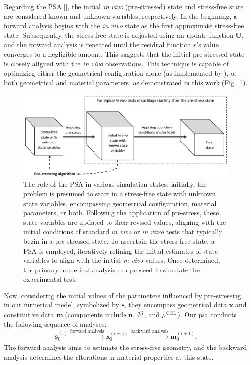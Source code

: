 Regarding the PSA [\cite{bols2013}], the initial \textit{in vivo} (pre-stressed) state and stress-free state are considered known and unknown variables, respectively. In the beginning, a forward analysis begins with the \textit{in vivo} state as the first approximate stress-free state. Subsequently, the stress-free state is adjusted using an update function $\textbf{U}$, and the forward analysis is repeated until the residual function $r$'s value converges to a negligible amount. This suggests that the initial pre-stressed state is closely aligned with the \textit{in vivo} observations. This technique is capable of optimizing either the geometrical configuration alone (as implemented by \cite{wang2018}), or both geometrical and material parameters, as demonstrated in this work (Fig.~\ref{fig:psa_chart}).
%
\begin{figure}
\includegraphics[width=\textwidth]{img/psa_chart.png}
\caption{The role of the PSA in various simulation states: initially, the problem is presumed to start in a stress-free state with unknown state variables, encompassing geometrical configuration, material parameters, or both. Following the application of pre-stress, these state variables are updated to their revised values, aligning with the initial conditions of standard \textit{in vivo} or \textit{in vitro} tests that typically begin in a pre-stressed state. To ascertain the stress-free state, a PSA is employed, iteratively refining the initial estimates of state variables to align with the initial \textit{in vivo} values. Once determined, the primary numerical analysis can proceed to simulate the experimental test.}
\label{fig:psa_chart}
\end{figure}

Now, considering the initial values of the parameters influenced by pre-stressing in our numerical model, symbolized by $\mathbf{s}$, they encompass geometrical data $\mathbf{x}$ and constitutive data $\mathbf{m}$ (components include $\mathbf{n}$, $\emptyset^{\rm{S}}$, and $\rho^{\rm{COL}}$). Our \ac{psa} conducts the following sequence of analyses:
%
\begin{equation}\label{eq:optimizer}
    \mathbf{s}_{0}^{(t)} \xrightarrow[]{\text{forward analysis}} \mathbf{x}_{0}^{(t+1)} \xrightarrow[]{\text{backward analysis}} \mathbf{m}_{0}^{(t+1)}.
\end{equation}
%
The forward analysis aims to estimate the stress-free geometry, and the backward analysis determines the alterations in material properties at this state.

